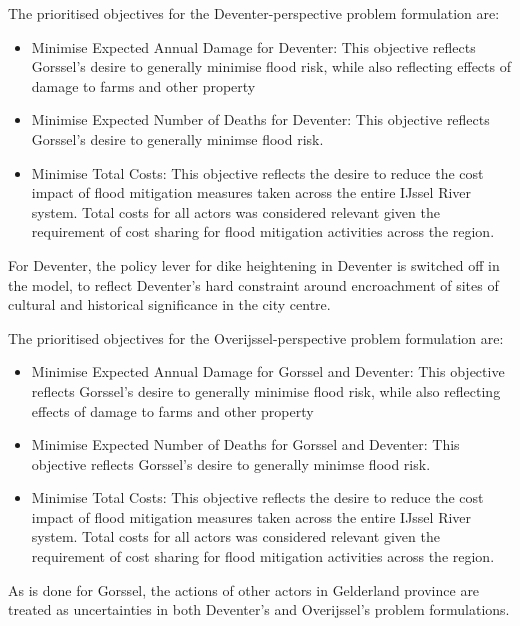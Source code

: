 \smallskip  

The prioritised objectives for the Deventer-perspective problem formulation are:
\begin{itemize}
    \item Minimise Expected Annual Damage for Deventer: This objective reflects Gorssel's desire to generally minimise flood risk, while also reflecting effects of damage to farms and other property
    \item Minimise Expected Number of Deaths for Deventer: This objective reflects Gorssel's desire to generally minimse flood risk.
    \item Minimise Total Costs: This objective reflects the desire to reduce the cost impact of flood mitigation measures taken across the entire IJssel River system. Total costs for all actors was considered relevant given the requirement of cost sharing for flood mitigation activities across the region.
\end{itemize}
For Deventer, the policy lever for dike heightening in Deventer is switched off in the model, to reflect Deventer's hard constraint around encroachment of sites of cultural and historical significance in the city centre.

The prioritised objectives for the Overijssel-perspective problem formulation are:
\begin{itemize}
    \item Minimise Expected Annual Damage for Gorssel and Deventer: This objective reflects Gorssel's desire to generally minimise flood risk, while also reflecting effects of damage to farms and other property
    \item Minimise Expected Number of Deaths for Gorssel and Deventer: This objective reflects Gorssel's desire to generally minimse flood risk.
    \item Minimise Total Costs: This objective reflects the desire to reduce the cost impact of flood mitigation measures taken across the entire IJssel River system. Total costs for all actors was considered relevant given the requirement of cost sharing for flood mitigation activities across the region.
\end{itemize}

As is done for Gorssel, the actions of other actors in Gelderland province are treated as uncertainties in both Deventer's and Overijssel's problem formulations.

